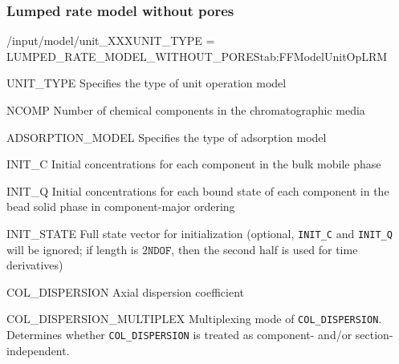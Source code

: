 \subsubsection{Lumped rate model without pores}

\begin{condsubgroup}{/input/model/unit\_XXX}{UNIT\_TYPE = LUMPED\_RATE\_MODEL\_WITHOUT\_PORES}{tab:FFModelUnitOpLRM}
  \begin{dataset}[type=string,range={\texttt{LUMPED\_RATE\_MODEL\_WITHOUT\_PORES}},length=1]{UNIT\_TYPE}
    Specifies the type of unit operation model
  \end{dataset}
  \begin{dataset}[type=int,range={$\geq 1$},length=1]{NCOMP}
    Number of chemical components in the chromatographic media
  \end{dataset}
  \begin{dataset}[type=string,range={See Section~\ref{sec:FFAdsorption}},length=1]{ADSORPTION\_MODEL}
    Specifies the type of adsorption model
  \end{dataset}
  \begin{dataset}[unit=\si{\mol\per\cubic\metre\of{IV}},type=double,range={$\geq 0$},length={\texttt{NCOMP}}]{INIT\_C}
    Initial concentrations for each component in the bulk mobile phase
  \end{dataset}
  \begin{dataset}[unit=\si{\mol\per\cubic\metre\of{SP}},type=double,range={$\geq 0$},length={\texttt{NTOTALBND}}]{INIT\_Q}
    Initial concentrations for each bound state of each component in the bead solid phase in component-major ordering
  \end{dataset}
  \begin{dataset}[unit=various,type=double,range={$\mathds{R}$},length={\texttt{NDOF} / $2\texttt{NDOF}$}]{INIT\_STATE}
    Full state vector for initialization (optional, \texttt{INIT\_C} and \texttt{INIT\_Q} will be ignored; if length is $2\texttt{NDOF}$, then the second half is used for time derivatives)
  \end{dataset}
  \begin{dataset}[unit=\si{\square\metre\of{IV}\per\second},type=double,range={$\geq 0$},length={see \texttt{{COL\_DISPERSION\_MULTIPLEX}}}]{COL\_DISPERSION}
    Axial dispersion coefficient
  \end{dataset}
  \begin{dataset}[unit=--,type=int,range={$\{0, \dots, 3 \}$},length={1}]{COL\_DISPERSION\_MULTIPLEX}
    Multiplexing mode of \texttt{COL\_DISPERSION}.
    Determines whether \texttt{COL\_DISPERSION} is treated as component- and/or section-independent.


\end{dataset}
\end{condsubgroup}
